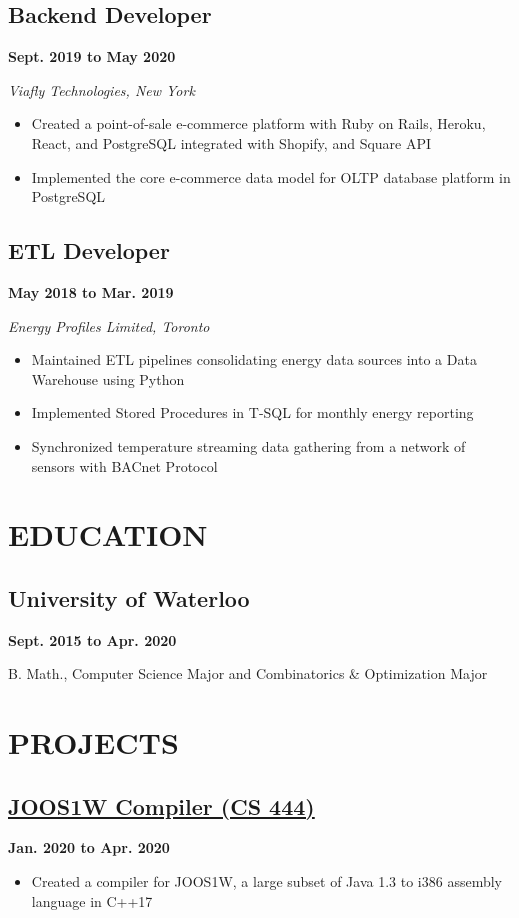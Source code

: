 \documentclass[12pt]{extarticle}
\begin{document}
\subsection*{Backend Developer} \hfill \textbf{Sept. 2019 to May 2020}

\textit{Viafly Technologies, New York}
\begin{itemize}
  \item Created a point-of-sale e-commerce platform with Ruby on Rails, Heroku, React, and PostgreSQL integrated with Shopify, and Square API
  \item Implemented the core e-commerce data model for OLTP database platform in PostgreSQL
\end{itemize}

\subsection*{ETL Developer} \hfill \textbf{May 2018 to Mar. 2019}

\textsl{Energy Profiles Limited, Toronto}
\begin{itemize}
  \item Maintained ETL pipelines consolidating energy data sources into a Data Warehouse using Python
  \item Implemented Stored Procedures in T-SQL for monthly energy reporting
  \item Synchronized temperature streaming data gathering from a network of sensors with BACnet Protocol
\end{itemize}

\section*{EDUCATION}
\subsection*{University of Waterloo} \hfill \textbf{Sept. 2015 to Apr. 2020}

B. Math., Computer Science Major and Combinatorics \& Optimization Major


\section*{PROJECTS}
\subsection*{\href{https://github.com/cgwelcome/SLC}{JOOS1W Compiler (CS 444)}
} \hfill \textbf{Jan. 2020 to Apr. 2020}
\begin{itemize}
  \item Created a compiler for JOOS1W, a large subset of Java 1.3 to i386 assembly language in C++17
\end{itemize}
\end{document}
